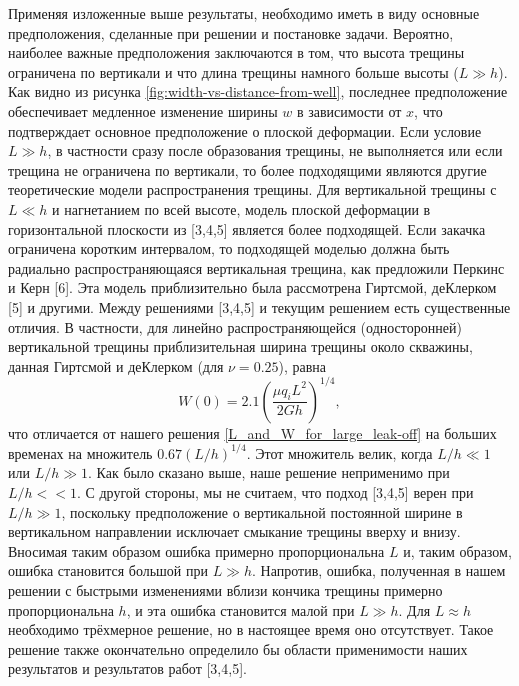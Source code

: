 \documentclass[a4paper, 11pt]{article}
\begin{document}
Применяя изложенные выше результаты, необходимо иметь в виду основные предположения, сделанные при решении и постановке задачи.
Вероятно, наиболее важные предположения заключаются в том, что высота трещины ограничена по вертикали и что длина трещины намного больше высоты ($L\gg h$).
Как видно из рисунка \ref{fig:width-vs-distance-from-well}, последнее предположение обеспечивает медленное изменение ширины $w$ в зависимости от $x$, что подтверждает основное предположение о плоской деформации.
Если условие $L\gg h$, в частности сразу после образования трещины, не выполняется или если трещина не ограничена по вертикали, то более подходящими являются другие теоретические модели распространения трещины.
Для вертикальной трещины с $L\ll h$ и нагнетанием по всей высоте, модель плоской деформации в горизонтальной плоскости из [3,4,5] является более подходящей.
Если закачка ограничена коротким интервалом, то подходящей моделью должна быть радиально распространяющаяся вертикальная трещина, как предложили Перкинс и Керн [6].
Эта модель приблизительно была рассмотрена Гиртсмой, деКлерком [5] и другими.
Между решениями [3,4,5] и текущим решением есть существенные отличия.
В частности, для линейно распространяющейся (односторонней) вертикальной трещины приблизительная ширина трещины около скважины, данная Гиртсмой и деКлерком (для $\nu=0.25$), равна
$$
W(0)=2.1\left(\frac{\mu q_iL^2}{2Gh}\right)^{1/4},
$$
что отличается от нашего решения \eqref{L_and_W_for_large_leak-off} на больших временах на множитель $0.67\left(L/h\right)^{1/4}$.
Этот множитель велик, когда $L/h\ll1$ или $L/h\gg1$.
Как было сказано выше, наше решение неприменимо при $L/h<<1$.
С другой стороны, мы не считаем, что подход [3,4,5] верен при $L/h\gg 1$, поскольку предположение о вертикальной постоянной ширине в вертикальном направлении исключает смыкание трещины вверху и внизу.
Вносимая таким образом ошибка примерно пропорциональна $L$ и, таким образом, ошибка становится большой при $L\gg h$.
Напротив, ошибка, полученная в нашем решении с быстрыми изменениями вблизи кончика трещины примерно пропорциональна $h$, и эта ошибка становится малой при $L\gg h$.
Для $L\approx h$ необходимо трёхмерное решение, но в настоящее время оно отсутствует.
Такое решение также окончательно определило бы области применимости наших результатов и результатов работ [3,4,5].
\end{document}
